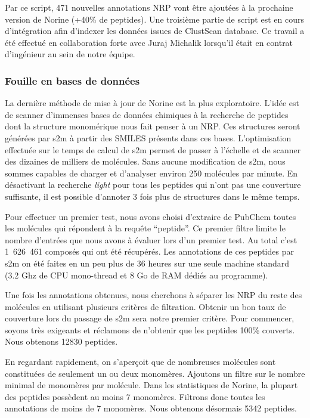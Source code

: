 Par ce script, 471 nouvelles annotations NRP vont être ajoutées à la prochaine version de Norine (+40\% de peptides).
Une troisième partie de script est en cours d'intégration afin d'indexer les données issues de ClustScan database.
Ce travail a été effectué en collaboration forte avec Juraj Michalik lorsqu'il était en contrat d'ingénieur au sein de notre équipe.



\subsubsection{Fouille en bases de données}
\label{nor_auto}

La dernière méthode de mise à jour de Norine est la plus exploratoire.
L'idée est de scanner d'immenses bases de données chimiques à la recherche de peptides dont la structure monomérique nous fait penser à un NRP.
Ces structures seront générées par s2m à partir des SMILES présents dans ces bases.
L'optimisation effectuée sur le temps de calcul de s2m permet de passer à l'échelle et de scanner des dizaines de milliers de molécules.
Sans aucune modification de s2m, nous sommes capables de charger et d'analyser environ 250 molécules par minute.
En désactivant la recherche \textit{light} pour tous les peptides qui n'ont pas une couverture suffisante, il est possible d'annoter 3 fois plus de structures dans le même temps.

Pour effectuer un premier test, nous avons choisi d'extraire de PubChem toutes les molécules qui répondent à la requête ``peptide''.
Ce premier filtre limite le nombre d'entrées que nous avons à évaluer lors d'un premier test.
Au total c'est 1~626~461 composés qui ont été récupérés.
Les annotations de ces peptides par s2m on été faites en un peu plus de 36 heures sur une seule machine standard (3.2 Ghz de CPU mono-thread et 8 Go de RAM dédiés au programme).

Une fois les annotations obtenues, nous cherchons à séparer les NRP du reste des molécules en utilisant plusieurs critères de filtration.
Obtenir un bon taux de couverture lors du passage de s2m sera notre premier critère.
Pour commencer, soyons très exigeants et réclamons de n'obtenir que les peptides 100\% couverts.
Nous obtenons 12830 peptides.

En regardant rapidement, on s'aperçoit que de nombreuses molécules sont constituées de seulement un ou deux monomères.
Ajoutons un filtre sur le nombre minimal de monomères par molécule.
Dans les statistiques de Norine, la plupart des peptides possèdent au moins 7 monomères.
Filtrons donc toutes les annotations de moins de 7 monomères.
Nous obtenons désormais 5342 peptides.

